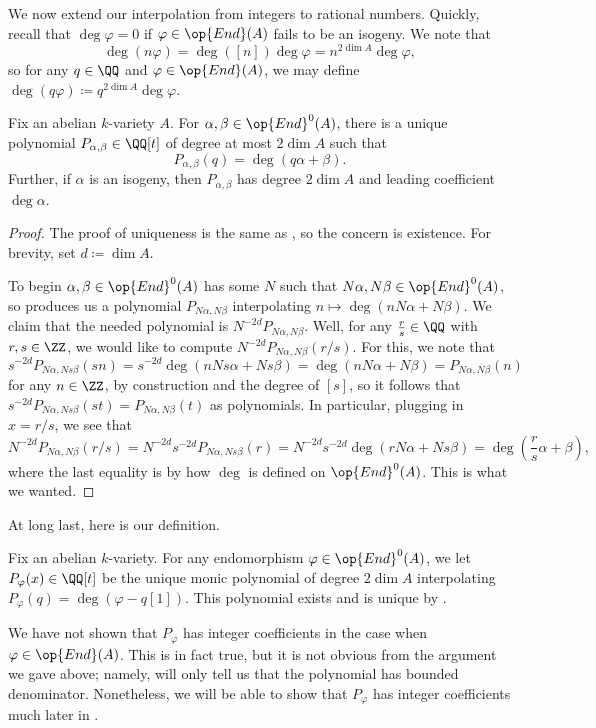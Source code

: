 \documentclass{amsart}
\begin{document}
We now extend our interpolation from integers to rational numbers. Quickly, recall that $\deg\varphi=0$ if $\varphi\in\op{End}(A)$ fails to be an isogeny. We note that
\[\deg(n\varphi)=\deg([n])\deg\varphi=n^{2\dim A}\deg\varphi,\]
so for any $q\in\QQ$ and $\varphi\in\op{End}(A)$, we may define $\deg(q\varphi)\coloneqq q^{2\dim A}\deg\varphi$.
\begin{proposition} \label{prop:get-char-poly}
	Fix an abelian $k$-variety $A$. For $\alpha,\beta\in\op{End}^0(A)$, there is a unique polynomial $P_{\alpha,\beta}\in\QQ[t]$ of degree at most $2\dim A$ such that
	\[P_{\alpha,\beta}(q)=\deg(q\alpha+\beta).\]
	Further, if $\alpha$ is an isogeny, then $P_{\alpha,\beta}$ has degree $2\dim A$ and leading coefficient $\deg\alpha$.
\end{proposition}
\begin{proof}
	The proof of uniqueness is the same as , so the concern is existence. For brevity, set $d\coloneqq\dim A$.

	To begin $\alpha,\beta\in\op{End}^0(A)$ has some $N$ such that $N\alpha,N\beta\in\op{End}^0(A)$, so  produces us a polynomial $P_{N\alpha,N\beta}$ interpolating $n\mapsto\deg(nN\alpha+N\beta)$. We claim that the needed polynomial is $N^{-2d}P_{N\alpha,N\beta}$. Well, for any $\frac rs\in\QQ$ with $r,s\in\ZZ$, we would like to compute $N^{-2d}P_{N\alpha,N\beta}(r/s)$. For this, we note that
	\[s^{-2d}P_{N\alpha,Ns\beta}(sn)=s^{-2d}\deg(nNs\alpha+Ns\beta)=\deg(nN\alpha+N\beta)=P_{N\alpha,N\beta}(n)\]
	for any $n\in\ZZ$, by construction and the degree of $[s]$, so it follows that $s^{-2d}P_{N\alpha,Ns\beta}(st)=P_{N\alpha,N\beta}(t)$ as polynomials. In particular, plugging in $x=r/s$, we see that
	\[N^{-2d}P_{N\alpha,N\beta}(r/s)=N^{-2d}s^{-2d}P_{N\alpha,Ns\beta}(r)=N^{-2d}s^{-2d}\deg(rN\alpha+Ns\beta)=\deg\left(\frac rs\alpha+\beta\right),\]
	where the last equality is by how $\deg$ is defined on $\op{End}^0(A)$. This is what we wanted.
\end{proof}
At long last, here is our definition.
\begin{definition}
	Fix an abelian $k$-variety. For any endomorphism $\varphi\in\op{End}^0(A)$, we let $P_\varphi(x)\in\QQ[t]$ be the unique monic polynomial of degree $2\dim A$ interpolating $P_\varphi(q)=\deg(\varphi-q[1])$. This polynomial exists and is unique by .
\end{definition}
\begin{remark}
	We have not shown that $P_\varphi$ has integer coefficients in the case when $\varphi\in\op{End}(A)$. This is in fact true, but it is not obvious from the argument we gave above; namely,  will only tell us that the polynomial has bounded denominator. Nonetheless, we will be able to show that $P_\varphi$ has integer coefficients much later in .
\end{remark}
\end{document}
